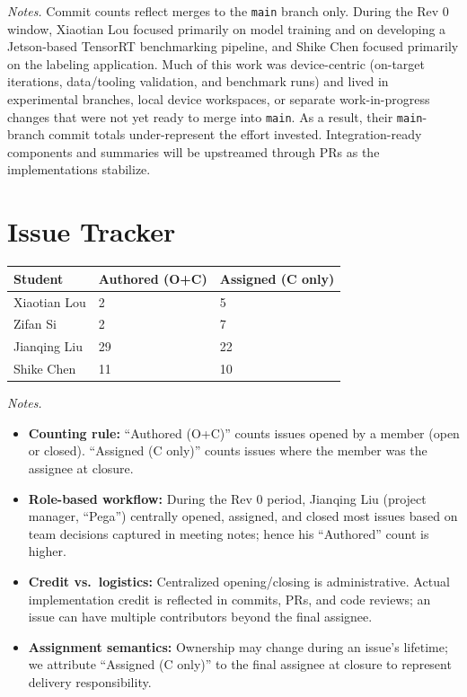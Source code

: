 \documentclass{article}
\begin{document}
\noindent\textit{Notes.} Commit counts reflect merges to the \texttt{main} branch only. During the Rev 0 window, Xiaotian Lou focused primarily on model training and on developing a Jetson-based TensorRT benchmarking pipeline, and Shike Chen focused primarily on the labeling application. Much of this work was device-centric (on-target iterations, data/tooling validation, and benchmark runs) and lived in experimental branches, local device workspaces, or separate work-in-progress changes that were not yet ready to merge into \texttt{main}. As a result, their \texttt{main}-branch commit totals under-represent the effort invested. Integration-ready components and summaries will be upstreamed through PRs as the implementations stabilize.

\section{Issue Tracker}


\begin{table}[H]
  \centering
  \begin{tabular}{lll}
    \toprule
    \textbf{Student} & \textbf{Authored (O+C)} & \textbf{Assigned (C only)} \\
    \midrule
    Xiaotian Lou     & 2                       & 5                          \\
    Zifan Si         & 2                       & 7                          \\
    Jianqing Liu     & 29                      & 22                         \\
    Shike Chen       & 11                      & 10                         \\
    \bottomrule
  \end{tabular}
\end{table}

\noindent\textit{Notes.}
\begin{itemize}
  \item \textbf{Counting rule:} “Authored (O+C)” counts issues opened by a member (open or closed). “Assigned (C only)” counts issues where the member was the assignee at closure.
  \item \textbf{Role-based workflow:} During the Rev 0 period, Jianqing Liu (project manager, “Pega”) centrally opened, assigned, and closed most issues based on team decisions captured in meeting notes; hence his “Authored” count is higher.
  \item \textbf{Credit vs.\ logistics:} Centralized opening/closing is administrative. Actual implementation credit is reflected in commits, PRs, and code reviews; an issue can have multiple contributors beyond the final assignee.
  \item \textbf{Assignment semantics:} Ownership may change during an issue’s lifetime; we attribute “Assigned (C only)” to the final assignee at closure to represent delivery responsibility.
\end{itemize}
\end{document}
